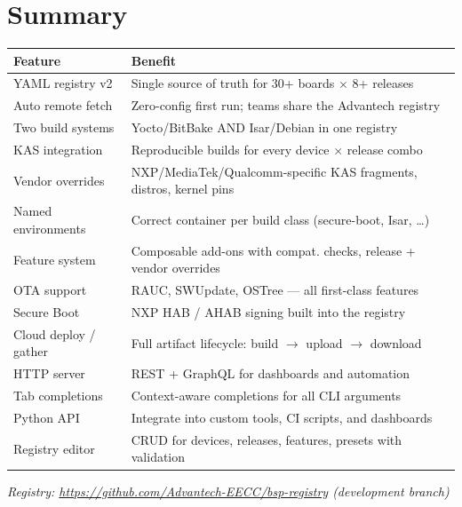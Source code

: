 \documentclass[a4paper,11pt]{article}
\begin{document}
\section{Summary}

\begin{tabularx}{\linewidth}{L{50mm}X}
  \textbf{Feature} & \textbf{Benefit} \\
  \toprule
   YAML registry v2         & Single source of truth for 30+ boards $\times$ 8+ releases \\
    Auto remote fetch        & Zero-config first run; teams share the Advantech registry \\
   Two build systems        & Yocto/BitBake AND Isar/Debian in one registry \\
    KAS integration          & Reproducible builds for every device $\times$ release combo \\
   Vendor overrides         & NXP/MediaTek/Qualcomm-specific KAS fragments, distros, kernel pins \\
    Named environments       & Correct container per build class (secure-boot, Isar, \ldots) \\
   Feature system           & Composable add-ons with compat. checks, release + vendor overrides \\
    OTA support              & RAUC, SWUpdate, OSTree --- all first-class features \\
   Secure Boot              & NXP HAB / AHAB signing built into the registry \\
    Cloud deploy / gather    & Full artifact lifecycle: build $\to$ upload $\to$ download \\
   HTTP server              & REST + GraphQL for dashboards and automation \\
    Tab completions          & Context-aware completions for all CLI arguments \\
   Python API               & Integrate into custom tools, CI scripts, and dashboards \\
    Registry editor          & CRUD for devices, releases, features, presets with validation \\
  \bottomrule
\end{tabularx}

\vspace{8mm}
\begin{center}
  \small\itshape
  Registry: \url{https://github.com/Advantech-EECC/bsp-registry} (development branch)
\end{center}
\end{document}

